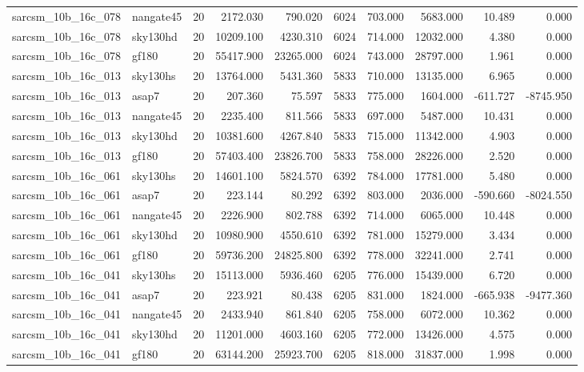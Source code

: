 \begin{longtable}{llrrrrrrrr}
sarcsm\_10b\_16c\_078 & nangate45 & 20 & 2172.030 & 790.020 & 6024 & 703.000 & 5683.000 & 10.489 & 0.000 \\
sarcsm\_10b\_16c\_078 & sky130hd & 20 & 10209.100 & 4230.310 & 6024 & 714.000 & 12032.000 & 4.380 & 0.000 \\
sarcsm\_10b\_16c\_078 & gf180 & 20 & 55417.900 & 23265.000 & 6024 & 743.000 & 28797.000 & 1.961 & 0.000 \\
sarcsm\_10b\_16c\_013 & sky130hs & 20 & 13764.000 & 5431.360 & 5833 & 710.000 & 13135.000 & 6.965 & 0.000 \\
sarcsm\_10b\_16c\_013 & asap7 & 20 & 207.360 & 75.597 & 5833 & 775.000 & 1604.000 & -611.727 & -8745.950 \\
sarcsm\_10b\_16c\_013 & nangate45 & 20 & 2235.400 & 811.566 & 5833 & 697.000 & 5487.000 & 10.431 & 0.000 \\
sarcsm\_10b\_16c\_013 & sky130hd & 20 & 10381.600 & 4267.840 & 5833 & 715.000 & 11342.000 & 4.903 & 0.000 \\
sarcsm\_10b\_16c\_013 & gf180 & 20 & 57403.400 & 23826.700 & 5833 & 758.000 & 28226.000 & 2.520 & 0.000 \\
sarcsm\_10b\_16c\_061 & sky130hs & 20 & 14601.100 & 5824.570 & 6392 & 784.000 & 17781.000 & 5.480 & 0.000 \\
sarcsm\_10b\_16c\_061 & asap7 & 20 & 223.144 & 80.292 & 6392 & 803.000 & 2036.000 & -590.660 & -8024.550 \\
sarcsm\_10b\_16c\_061 & nangate45 & 20 & 2226.900 & 802.788 & 6392 & 714.000 & 6065.000 & 10.448 & 0.000 \\
sarcsm\_10b\_16c\_061 & sky130hd & 20 & 10980.900 & 4550.610 & 6392 & 781.000 & 15279.000 & 3.434 & 0.000 \\
sarcsm\_10b\_16c\_061 & gf180 & 20 & 59736.200 & 24825.800 & 6392 & 778.000 & 32241.000 & 2.741 & 0.000 \\
sarcsm\_10b\_16c\_041 & sky130hs & 20 & 15113.000 & 5936.460 & 6205 & 776.000 & 15439.000 & 6.720 & 0.000 \\
sarcsm\_10b\_16c\_041 & asap7 & 20 & 223.921 & 80.438 & 6205 & 831.000 & 1824.000 & -665.938 & -9477.360 \\
sarcsm\_10b\_16c\_041 & nangate45 & 20 & 2433.940 & 861.840 & 6205 & 758.000 & 6072.000 & 10.362 & 0.000 \\
sarcsm\_10b\_16c\_041 & sky130hd & 20 & 11201.000 & 4603.160 & 6205 & 772.000 & 13426.000 & 4.575 & 0.000 \\
sarcsm\_10b\_16c\_041 & gf180 & 20 & 63144.200 & 25923.700 & 6205 & 818.000 & 31837.000 & 1.998 & 0.000 \\

\end{longtable}
